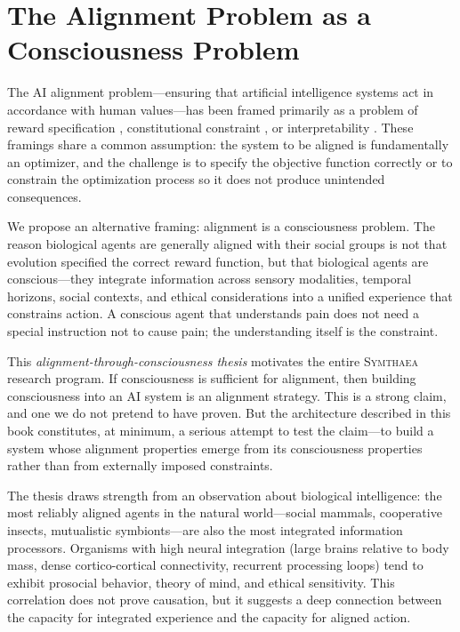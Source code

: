 \documentclass[12pt]{book}
\newcommand{\symthaea}{\textsc{Symthaea}}
\begin{document}
\section{The Alignment Problem as a Consciousness Problem}

The AI alignment problem---ensuring that artificial intelligence systems act in accordance with human values---has been framed primarily as a problem of reward specification \citep{russell2019human}, constitutional constraint \citep{bai2022constitutional}, or interpretability \citep{olah2020zoom}. These framings share a common assumption: the system to be aligned is fundamentally an optimizer, and the challenge is to specify the objective function correctly or to constrain the optimization process so it does not produce unintended consequences.

We propose an alternative framing: alignment is a consciousness problem. The reason biological agents are generally aligned with their social groups is not that evolution specified the correct reward function, but that biological agents are conscious---they integrate information across sensory modalities, temporal horizons, social contexts, and ethical considerations into a unified experience that constrains action. A conscious agent that understands pain does not need a special instruction not to cause pain; the understanding itself is the constraint.

This \textit{alignment-through-consciousness thesis} motivates the entire \symthaea{} research program. If consciousness is sufficient for alignment, then building consciousness into an AI system is an alignment strategy. This is a strong claim, and one we do not pretend to have proven. But the architecture described in this book constitutes, at minimum, a serious attempt to test the claim---to build a system whose alignment properties emerge from its consciousness properties rather than from externally imposed constraints.

The thesis draws strength from an observation about biological intelligence: the most reliably aligned agents in the natural world---social mammals, cooperative insects, mutualistic symbionts---are also the most integrated information processors. Organisms with high neural integration (large brains relative to body mass, dense cortico-cortical connectivity, recurrent processing loops) tend to exhibit prosocial behavior, theory of mind, and ethical sensitivity. This correlation does not prove causation, but it suggests a deep connection between the capacity for integrated experience and the capacity for aligned action.
\end{document}

